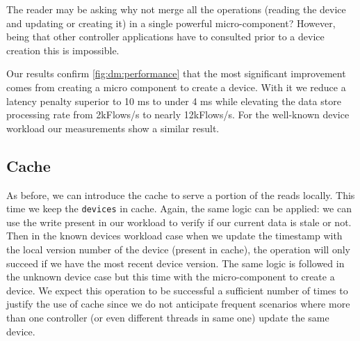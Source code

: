 The reader may be asking why not merge all the operations (reading the device and updating or creating it) in a single powerful 
micro-component? However, being that other controller applications have to consulted prior to a device creation this is impossible. 

Our results confirm \ref{fig:dm:performance} that the most significant improvement comes from creating a micro component to create a device. With it we reduce a latency penalty superior to 10 ms to under 4 ms while elevating the data store processing rate from 2kFlows/s to nearly 12kFlows/s.  For the well-known device workload our measurements show a similar result. 

\subsection{Cache}
As before, we can introduce the cache to serve a portion of the reads locally. 
This time we keep the \texttt{devices} in cache. 
Again, the same logic  can be applied: we can use the write present in our workload to verify if our current data is stale or not.  Then in the known devices workload case when we update the timestamp with the local version number of the device (present in cache), the operation will only succeed if we have the most recent device version. 
The same logic is followed in the unknown device case but this time with the micro-component to create a device. 
We expect this operation to be successful a sufficient number of times to justify the use of cache since we do not anticipate frequent scenarios where more than one controller (or even different threads in same one) update the same device. 


